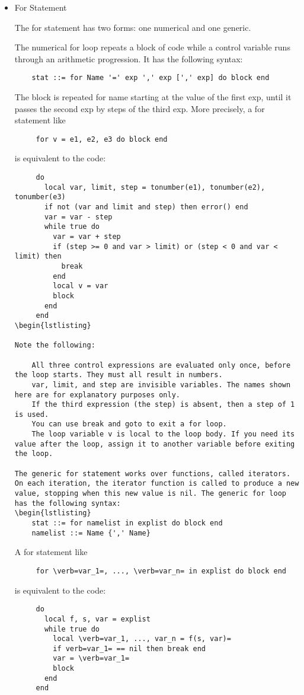\begin{itemize}
\item For Statement

The for statement has two forms: one numerical and one generic.

The numerical for loop repeats a block of code while a control variable runs through an arithmetic progression. It has the following syntax:
\begin{lstlisting}
	stat ::= for Name '=' exp ',' exp [',' exp] do block end
\end{lstlisting}
The block is repeated for name starting at the value of the first exp, until it passes the second exp by steps of the third exp. More precisely, a for statement like
\begin{lstlisting}
     for v = e1, e2, e3 do block end
\end{lstlisting}
is equivalent to the code:
\begin{lstlisting}
     do
       local var, limit, step = tonumber(e1), tonumber(e2), tonumber(e3)
       if not (var and limit and step) then error() end
       var = var - step
       while true do
         var = var + step
         if (step >= 0 and var > limit) or (step < 0 and var < limit) then
           break
         end
         local v = var
         block
       end
     end
\begin{lstlisting}

Note the following:

    All three control expressions are evaluated only once, before the loop starts. They must all result in numbers.
    var, limit, and step are invisible variables. The names shown here are for explanatory purposes only.
    If the third expression (the step) is absent, then a step of 1 is used.
    You can use break and goto to exit a for loop.
    The loop variable v is local to the loop body. If you need its value after the loop, assign it to another variable before exiting the loop.

The generic for statement works over functions, called iterators. On each iteration, the iterator function is called to produce a new value, stopping when this new value is nil. The generic for loop has the following syntax:
\begin{lstlisting}
	stat ::= for namelist in explist do block end
	namelist ::= Name {',' Name}
\end{lstlisting}

A for statement like
\begin{lstlisting}
     for \verb=var_1=, ..., \verb=var_n= in explist do block end
\end{lstlisting}
is equivalent to the code:
\begin{lstlisting}
     do
       local f, s, var = explist
       while true do
         local \verb=var_1, ..., var_n = f(s, var)=
         if verb=var_1= == nil then break end
         var = \verb=var_1=
         block
       end
     end
\end{lstlisting}


\end{itemize}
